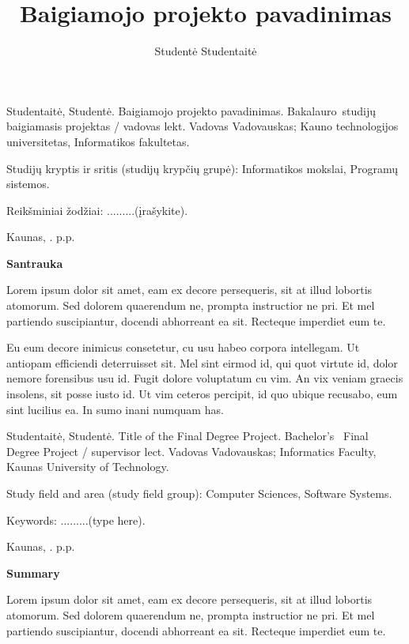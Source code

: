 \documentclass{ktuthesis}
\title{Baigiamojo projekto pavadinimas}
\author{Studentė Studentaitė}
\begin{document}
  \maketitle

  \thispagestyle{empty}
  Studentaitė, Studentė. Baigiamojo projekto pavadinimas. Bakalauro studijų baigiamasis projektas / vadovas lekt. Vadovas Vadovauskas; Kauno technologijos universitetas, Informatikos fakultetas.

  Studijų kryptis ir sritis (studijų krypčių grupė): Informatikos mokslai, Programų sistemos.

  Reikšminiai žodžiai: .........(įrašykite).

  Kaunas, \the\year. \pageref{LastPage} p.p.

  \begin{center}
    \textbf{Santrauka}
  \end{center}

  Lorem ipsum dolor sit amet, eam ex decore persequeris, sit at illud lobortis atomorum. Sed dolorem quaerendum ne, prompta instructior ne pri. Et mel partiendo suscipiantur, docendi abhorreant ea sit. Recteque imperdiet eum te.

  Eu eum decore inimicus consetetur, cu usu habeo corpora intellegam. Ut antiopam efficiendi deterruisset sit. Mel sint eirmod id, qui quot virtute id, dolor nemore forensibus usu id. Fugit dolore voluptatum cu vim. An vix veniam graecis insolens, sit posse iusto id. Ut vim ceteros percipit, id quo ubique recusabo, eum sint lucilius ea. In sumo inani numquam has.

  \clearpage

  \thispagestyle{empty}
  Studentaitė, Studentė. Title of the Final Degree Project. Bachelor's  Final Degree Project / supervisor lect. Vadovas Vadovauskas; Informatics Faculty, Kaunas University of Technology.

  Study field and area (study field group): Computer Sciences, Software Systems.

  Keywords: .........(type here).

  Kaunas, \the\year. \pageref{LastPage} p.p.

  \begin{center}
    \textbf{Summary}
  \end{center}

  Lorem ipsum dolor sit amet, eam ex decore persequeris, sit at illud lobortis atomorum. Sed dolorem quaerendum ne, prompta instructior ne pri. Et mel partiendo suscipiantur, docendi abhorreant ea sit. Recteque imperdiet eum te.
\end{document}
